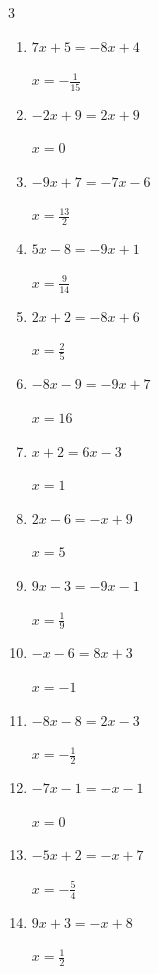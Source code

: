 \begin{multicols}{3}
\begin{enumerate}
        $\displaystyle x=-\frac{3}{13}$

  \item $7x+5=-8x+4$

        $\displaystyle x=-\frac{1}{15}$

  \item $-2x+9=2x+9$

        $\displaystyle x=0$

  \item $-9x+7=-7x-6$

        $\displaystyle x=\frac{13}{2}$

  \item $5x-8=-9x+1$

        $\displaystyle x=\frac{9}{14}$

\columnbreak %

\resetques

  \item $2x+2=-8x+6$

        $\displaystyle x=\frac{2}{5}$

  \item $-8x-9=-9x+7$

        $\displaystyle x=16$

  \item $x+2=6x-3$

        $\displaystyle x=1$

  \item $2x-6=-x+9$

        $\displaystyle x=5$

  \item $9x-3=-9x-1$

        $\displaystyle x=\frac{1}{9}$

  \item $-x-6=8x+3$

        $\displaystyle x=-1$

  \item $-8x-8=2x-3$

        $\displaystyle x=-\frac{1}{2}$

  \item $-7x-1=-x-1$

        $\displaystyle x=0$

  \item $-5x+2=-x+7$

        $\displaystyle x=-\frac{5}{4}$

  \item $9x+3=-x+8$

        $\displaystyle x=\frac{1}{2}$


\end{enumerate}
\end{multicols}
